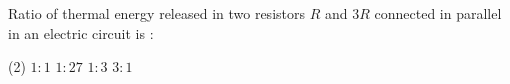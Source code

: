 \item Ratio of thermal energy released in two resistors \(R\) and \(3R\) connected in parallel in an electric circuit is :
\begin{tasks}(2)
    \task \(1 : 1\)
    \task \(1 : 27\)
    \task \(1 : 3\)
    \task \(3 : 1\)
\end{tasks}